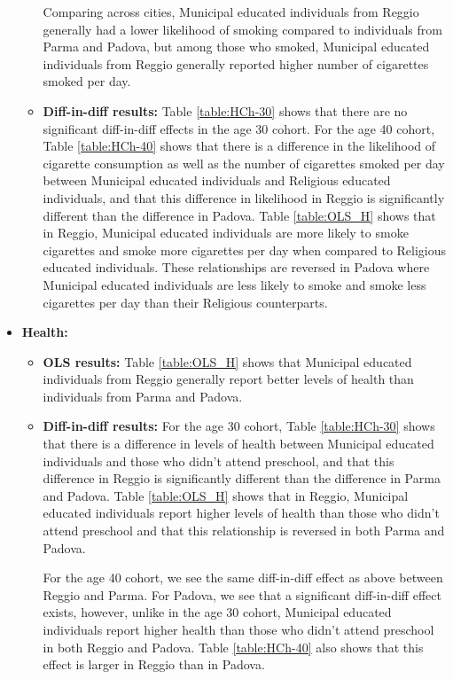 \documentclass[11pt]{article}
\begin{document}
\begin{itemize}
\begin{itemize}
	Comparing across cities, Municipal educated individuals from Reggio generally had a lower likelihood of smoking compared to individuals from Parma and Padova, but among those who smoked, Municipal educated individuals from Reggio generally reported higher number of cigarettes smoked per day.
	
	\item \textbf{Diff-in-diff results:} Table \ref{table:HCh-30} shows that there are no significant diff-in-diff effects in the age 30 cohort. For the age 40 cohort,  Table \ref{table:HCh-40} shows that there is a difference in the likelihood of cigarette consumption as well as the number of cigarettes smoked per day between Municipal educated individuals and Religious educated individuals, and that this difference in likelihood in Reggio is significantly different than the difference in Padova. Table \ref{table:OLS_H} shows that in Reggio, Municipal educated individuals are more likely to smoke cigarettes and smoke more cigarettes per day when compared to Religious educated individuals. These relationships are reversed in Padova where Municipal educated individuals are less likely to smoke and smoke less cigarettes per day than their Religious counterparts.
	\end{itemize}

\item \textbf{Health:} 
	
	\begin{itemize}
	\item \textbf{OLS results:} Table  \ref{table:OLS_H} shows that Municipal educated individuals from Reggio generally report better levels of health than individuals from Parma and Padova.

	\item \textbf{Diff-in-diff results:} For the age 30 cohort, Table \ref{table:HCh-30} shows that there is a difference in levels of health between Municipal educated individuals and those who didn't attend preschool, and that this difference in Reggio is significantly different than the difference in Parma and Padova. Table \ref{table:OLS_H} shows that in Reggio, Municipal educated individuals report higher levels of health than those who didn't attend preschool and that this relationship is reversed in both Parma and Padova. 
	
	For the age 40 cohort, we see the same diff-in-diff effect as above between Reggio and Parma. For Padova, we see that a significant diff-in-diff effect exists, however, unlike in the age 30 cohort, Municipal educated individuals report higher health than those who didn't attend preschool in both Reggio and Padova. Table \ref{table:HCh-40} also shows that this effect is larger in Reggio than in Padova. 
	\end{itemize}


\end{itemize}
\end{document}

